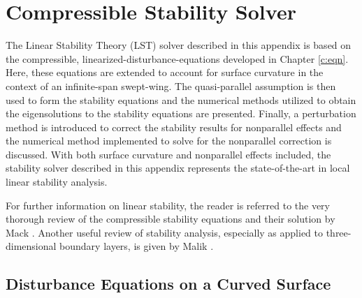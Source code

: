 %
%
%
%
%
\chapter{Compressible Stability Solver \label{a:LST}}

The Linear Stability Theory (LST) solver described in this appendix is based
on the compressible, linearized-disturbance-equations developed in Chapter
\ref{c:eqn}.  Here, these equations are extended to account for surface
curvature in the context of an infinite-span swept-wing.  The quasi-parallel
assumption is then used to form the stability equations and the numerical
methods utilized to obtain the eigensolutions to the stability equations are
presented.  Finally, a perturbation method is introduced to correct the
stability results for nonparallel effects and the numerical method implemented
to solve for the nonparallel correction is discussed.  With both surface
curvature and nonparallel effects included, the stability solver described in
this appendix represents the state-of-the-art in local linear stability
analysis.

For further information on linear stability, the reader is referred to the
very thorough review of the compressible stability equations and their
solution by Mack \cite{Mack:84a}.  Another useful review of stability
analysis, especially as applied to three-dimensional boundary layers, is given
by Malik \cite{Malik:90a}.

\section{Disturbance Equations on a Curved Surface \label{s:LSTeqn} }

